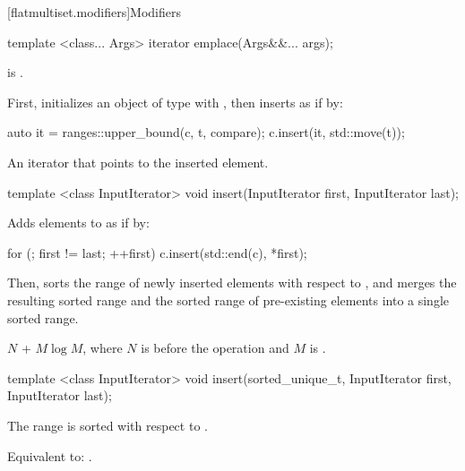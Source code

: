 \begin{addedblock}
[flatmultiset.modifiers]{Modifiers}

%
\begin{itemdecl}
template <class... Args> iterator emplace(Args&&... args);
\end{itemdecl}

\begin{itemdescr}
\pnum \constraints {} is .

\pnum
\effects
First, initializes an object  of type 
with , then inserts  as if by:
\begin{codeblock}
auto it = ranges::upper_bound(c, t, compare);
c.insert(it, std::move(t));
\end{codeblock}

\pnum
\returns
An iterator that points to the inserted element.
\end{itemdescr}

%
\begin{itemdecl}
template <class InputIterator>
  void insert(InputIterator first, InputIterator last);
\end{itemdecl}

\begin{itemdescr}
\pnum
\effects Adds elements to  as if by:
\begin{codeblock}
for (; first != last; ++first) {
  c.insert(std::end(c), *first);
}
\end{codeblock}
Then, sorts the range of newly inserted elements with respect to ,
and merges the resulting sorted range and the sorted range of pre-existing
elements into a single sorted range.

\pnum
\complexity
$N$ + $M \log M$, where $N$ is  before the operation and $M$
is .
\end{itemdescr}

%
\begin{itemdecl}
template <class InputIterator>
  void insert(sorted_unique_t, InputIterator first, InputIterator last);
\end{itemdecl}

\begin{itemdescr}
\pnum \expects
The range  is sorted with respect to .

\pnum \effects Equivalent to: .


\end{itemdescr}
\end{addedblock}
